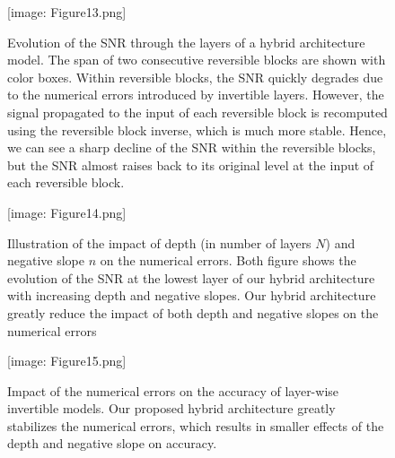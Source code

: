 \documentclass[twocolumn]{bmcart}
\def\texttt{[image: ]}
\begin{document}
\begin{backmatter}
\begin{figure}[t]
\texttt{[image: Figure13.png]}
\caption{
Evolution of the SNR through the layers of a hybrid architecture model.
The span of two consecutive reversible blocks are shown with color boxes.
Within reversible blocks, the SNR quickly degrades due to the numerical errors introduced by invertible layers.
However, the signal propagated to the input of each reversible block is recomputed using the reversible block inverse, which is much more stable.
Hence, we can see a sharp decline of the SNR within the reversible blocks, but the SNR almost raises back to its original level at the input of each reversible block.
}
\end{figure}


\begin{figure}[t]
\texttt{[image: Figure14.png]}
\caption{
Illustration of the impact of depth (in number of layers $N$) and negative slope $n$ on the numerical errors.
Both figure shows the evolution of the SNR at the lowest layer of our hybrid architecture with increasing depth and negative slopes.
Our hybrid architecture greatly reduce the impact of both depth and negative slopes on the numerical errors
}
\end{figure}

\begin{figure}[t]
\texttt{[image: Figure15.png]}
\caption{
Impact of the numerical errors on the accuracy of layer-wise invertible models.
Our proposed hybrid architecture greatly stabilizes the numerical errors,
which results in smaller effects of the depth and negative slope on accuracy.
}
\end{figure}

\end{backmatter}
\]
\end{document}
